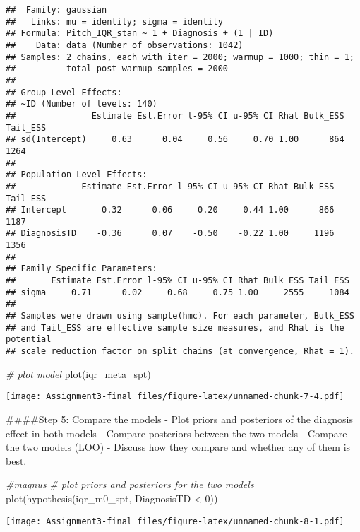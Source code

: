 \documentclass[
]{article}
\newenvironment{Shaded}{\begin{snugshade}}{\end{snugshade}}
\newcommand{\CommentTok}[1]{\textcolor[rgb]{0.56,0.35,0.01}{\textit{#1}}}
\newcommand{\FunctionTok}[1]{\textcolor[rgb]{0.00,0.00,0.00}{#1}}
\newcommand{\NormalTok}[1]{#1}
\newcommand{\StringTok}[1]{\textcolor[rgb]{0.31,0.60,0.02}{#1}}
\begin{document}
\begin{verbatim}
##  Family: gaussian 
##   Links: mu = identity; sigma = identity 
## Formula: Pitch_IQR_stan ~ 1 + Diagnosis + (1 | ID) 
##    Data: data (Number of observations: 1042) 
## Samples: 2 chains, each with iter = 2000; warmup = 1000; thin = 1;
##          total post-warmup samples = 2000
## 
## Group-Level Effects: 
## ~ID (Number of levels: 140) 
##               Estimate Est.Error l-95% CI u-95% CI Rhat Bulk_ESS Tail_ESS
## sd(Intercept)     0.63      0.04     0.56     0.70 1.00      864     1264
## 
## Population-Level Effects: 
##             Estimate Est.Error l-95% CI u-95% CI Rhat Bulk_ESS Tail_ESS
## Intercept       0.32      0.06     0.20     0.44 1.00      866     1187
## DiagnosisTD    -0.36      0.07    -0.50    -0.22 1.00     1196     1356
## 
## Family Specific Parameters: 
##       Estimate Est.Error l-95% CI u-95% CI Rhat Bulk_ESS Tail_ESS
## sigma     0.71      0.02     0.68     0.75 1.00     2555     1084
## 
## Samples were drawn using sample(hmc). For each parameter, Bulk_ESS
## and Tail_ESS are effective sample size measures, and Rhat is the potential
## scale reduction factor on split chains (at convergence, Rhat = 1).
\end{verbatim}

\begin{Shaded}
\begin{Highlighting}[]
\CommentTok{\# plot model}
\FunctionTok{plot}\NormalTok{(iqr\_meta\_spt)}
\end{Highlighting}
\end{Shaded}

\texttt{[image: Assignment3-final\_files/figure-latex/unnamed-chunk-7-4.pdf]}

\#\#\#\#Step 5: Compare the models - Plot priors and posteriors of the
diagnosis effect in both models - Compare posteriors between the two
models - Compare the two models (LOO) - Discuss how they compare and
whether any of them is best.

\begin{Shaded}
\begin{Highlighting}[]
\CommentTok{\#magnus}
\CommentTok{\# plot priors and posteriors for the two models}
\FunctionTok{plot}\NormalTok{(}\FunctionTok{hypothesis}\NormalTok{(iqr\_m0\_spt, }\StringTok{\textquotesingle{}DiagnosisTD \textless{} 0\textquotesingle{}}\NormalTok{))}
\end{Highlighting}
\end{Shaded}

\texttt{[image: Assignment3-final\_files/figure-latex/unnamed-chunk-8-1.pdf]}
\end{document}
